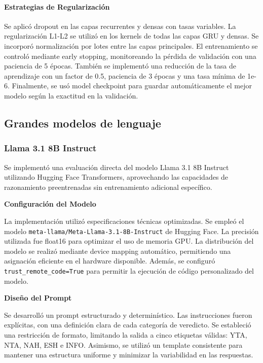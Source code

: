 \paragraph{Estrategias de Regularización}
Se aplicó dropout en las capas recurrentes y densas con tasas variables. La regularización L1-L2 se utilizó en los kernels de todas las capas GRU y densas. Se incorporó normalización por lotes entre las capas principales. El entrenamiento se controló mediante early stopping, monitoreando la pérdida de validación con una paciencia de 5 épocas. También se implementó una reducción de la tasa de aprendizaje con un factor de 0.5, paciencia de 3 épocas y una tasa mínima de 1e-6. Finalmente, se usó model checkpoint para guardar automáticamente el mejor modelo según la exactitud en la validación.

\subsection{Grandes modelos de lenguaje}

\subsubsection{Llama 3.1 8B Instruct}
Se implementó una evaluación directa del modelo Llama 3.1 8B Instruct utilizando Hugging Face Transformers, aprovechando las capacidades de razonamiento preentrenadas sin entrenamiento adicional específico.

\textbf{Configuración del Modelo}

La implementación utilizó especificaciones técnicas optimizadas. Se empleó el modelo \texttt{meta-llama/Meta-Llama-3.1-8B-Instruct} de Hugging Face. La precisión utilizada fue float16 para optimizar el uso de memoria GPU. La distribución del modelo se realizó mediante device mapping automático, permitiendo una asignación eficiente en el hardware disponible. Además, se configuró \texttt{trust\_remote\_code=True} para permitir la ejecución de código personalizado del modelo.

\textbf{Diseño del Prompt} 

Se desarrolló un prompt estructurado y determinístico. Las instrucciones fueron explícitas, con una definición clara de cada categoría de veredicto. Se estableció una restricción de formato, limitando la salida a cinco etiquetas válidas: YTA, NTA, NAH, ESH e INFO. Asimismo, se utilizó un template consistente para mantener una estructura uniforme y minimizar la variabilidad en las respuestas.

